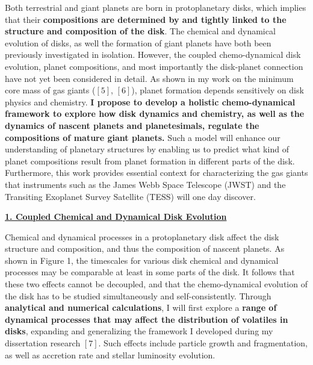 \documentclass[12pt, letterpaper]{article}
\begin{document}
Both terrestrial and giant planets are born in protoplanetary disks, which implies that their \textbf{compositions are determined by and tightly linked to the structure and composition of the disk}. The chemical and dynamical evolution of disks, as well the formation of giant planets have both been previously investigated in isolation. However, the coupled chemo-dynamical disk evolution, planet compositions, and most importantly the disk-planet connection have not yet been considered in detail. As shown in my work on the minimum core mass of gas giants ($[5]$, $[6]$), planet formation depends sensitively on disk physics and chemistry. \textbf{I propose to develop a holistic chemo-dynamical framework to explore how disk dynamics and chemistry, as well as the dynamics of nascent planets and planetesimals, regulate the compositions of mature giant planets.} Such a model will enhance our understanding of planetary structures by enabling us to predict what kind of planet compositions result from planet formation in different parts of the disk. Furthermore, this work provides essential context for characterizing the gas giants that instruments such as the James Webb Space Telescope (JWST) and the Transiting Exoplanet Survey Satellite (TESS) will one day discover. %

\vspace{0.2in}

\underline{\textbf{1. Coupled Chemical and Dynamical Disk Evolution}}

Chemical and dynamical processes in a protoplanetary disk affect the disk structure and composition, and thus the composition of nascent planets. As shown in Figure 1, the timescales for various disk chemical and dynamical processes may be comparable at least in some parts of the disk. It follows that these two effects cannot be decoupled, and that the chemo-dynamical evolution of the disk has to be studied simultaneously and self-consistently. Through \textbf{analytical and numerical calculations}, I will first explore a \textbf{range of dynamical processes that may affect the distribution of volatiles in disks}, expanding and generalizing the framework I developed during my dissertation research $[7]$. Such effects include particle growth and fragmentation, as well as accretion rate and stellar luminosity evolution.   
\end{document}
